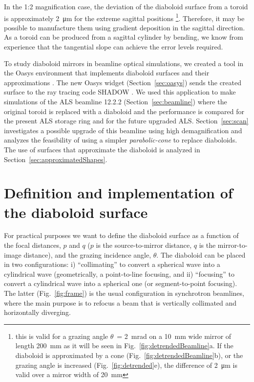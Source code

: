 \documentclass[preprint]{iucr}       %
\newcommand{\inred}[1]{{\color{red}#1}}
\begin{document}
In the 1:2 magnification case, the deviation of the diaboloid surface from a toroid is approximately \SI{2}{\micro\meter} for the extreme sagittal positions
\footnote{\inred{this is valid for a grazing angle $\theta$~= \SI{2}{\milli\radian} on a \SI{10}{\milli\meter} wide mirror of length \SI{200}{\milli\meter} as it will be seen in Fig.~\ref{fig:detrendedBeamline}a. If the diaboloid is approximated by a cone (Fig.~\ref{fig:detrendedBeamline}b), or the grazing angle is increased (Fig.~\ref{fig:detrended}e), the difference of \SI{2}{\micro\meter} is valid over a mirror width of \SI{20}{\milli\meter} }}. Therefore, it may be possible to manufacture them using gradient deposition in the sagittal direction. As a toroid can be produced from a sagittal cylinder by bending, we know from experience that the tangential slope can achieve the error levels required.


To study diaboloid mirrors in beamline optical simulations, we created a tool in the Oasys environment \cite{codeOASYS} that implements diaboloid surfaces and their approximations \cite{valSPIE} \cite{val2021}. The new Oasys widget (Section~\ref{sec:oasys}) sends the created surface to the ray tracing code SHADOW \cite{codeSHADOW}. We used this application to make simulations of the ALS beamline 12.2.2 (Section~\ref{sec:beamline}) where the original toroid is replaced with a diaboloid and the performance is compared for the present ALS storage ring and for the future upgraded ALS. Section~\ref{sec:scan} investigates a possible upgrade of this beamline using high demagnification and analyzes the feasibility of using a simpler \emph{parabolic-cone} to replace diaboloids. The use of surfaces that approximate the diaboloid is analyzed in Section~\ref{sec:approximatedShapes}.

\section{Definition and implementation of the diaboloid surface}
\label{sec:DiaboloidEqs}

For practical purposes we want to define the diaboloid surface as a function of the focal distances, $p$ and $q$ ($p$ is the source-to-mirror distance, $q$ is the mirror-to-image distance), and the grazing incidence angle, $\theta$. The diaboloid can be placed in two configurations: i) ``collimating'' to convert a spherical wave into a cylindrical wave (geometrically, a point-to-line focusing, and ii) ``focusing'' to convert a cylindrical wave into a spherical one (or segment-to-point focusing). The latter (Fig.~\ref{fig:frame}) is the usual configuration in synchrotron beamlines, where the main purpose is to refocus a beam that is vertically collimated and horizontally diverging. 
\end{document}
